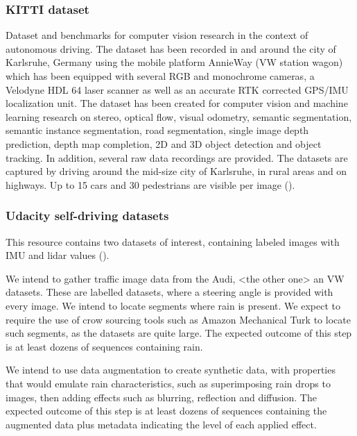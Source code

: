 \subsubsection{KITTI dataset}

Dataset and benchmarks for computer vision research in the context of autonomous driving. The dataset has been recorded in and around the city of Karlsruhe, Germany using the mobile platform AnnieWay (VW station wagon) which has been equipped with several RGB and monochrome cameras, a Velodyne HDL 64 laser scanner as well as an accurate RTK corrected GPS/IMU localization unit. The dataset has been created for computer vision and machine learning research on stereo, optical flow, visual odometry, semantic segmentation, semantic instance segmentation, road segmentation, single image depth prediction, depth map completion, 2D and 3D object detection and object tracking. In addition, several raw data recordings are provided. The datasets are captured by driving around the mid-size city of Karlsruhe, in rural areas and on highways. Up to 15 cars and 30 pedestrians are visible per image (\cite{Geiger2013IJRR}).

\subsubsection{Udacity self-driving datasets}

This resource contains two datasets of interest, containing labeled images with IMU and lidar values (\cite{UDACITY}).



We intend to gather traffic image data from the Audi, <the other one> an VW datasets. These are labelled datasets, where a steering angle is provided with every image. We intend to locate segments where rain is present. We expect to require the use of crow sourcing tools such as Amazon Mechanical Turk to locate such segments, as the datasets are quite large.
The expected outcome of this step is at least dozens of sequences containing rain.

We intend to use data augmentation to create synthetic data, with properties that would emulate rain characteristics, such as superimposing rain drops to images, then adding effects such as blurring, reflection and diffusion.  
The expected outcome of this step is at least dozens of sequences containing the augmented data plus metadata indicating the level of each applied effect.
